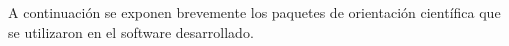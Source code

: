 \documentclass[11pt,lettersize]{article} %
\begin{document}
A continuación se exponen brevemente los paquetes de orientación científica que se utilizaron en el software desarrollado.


\end{document}
